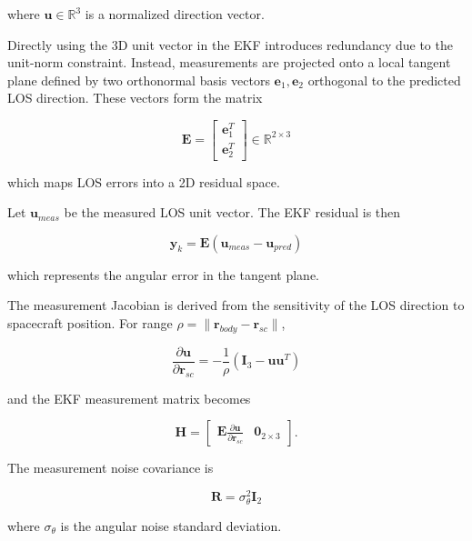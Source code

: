 \documentclass[twocolumn]{article}
\begin{document}
where $\mathbf{u}\in\mathbb{R}^3$ is a normalized direction vector.

Directly using the 3D unit vector in the EKF introduces redundancy due to the unit-norm constraint. Instead, measurements are projected onto a local tangent plane defined by two orthonormal basis vectors $\mathbf{e}_1,\mathbf{e}_2$ orthogonal to the predicted LOS direction. These vectors form the matrix

\begin{equation}
\mathbf{E} =
\begin{bmatrix}
\mathbf{e}_1^T \\
\mathbf{e}_2^T
\end{bmatrix}
\in \mathbb{R}^{2\times3}
\end{equation}

which maps LOS errors into a 2D residual space.

Let $\mathbf{u}_{meas}$ be the measured LOS unit vector. The EKF residual is then

\begin{equation}
\mathbf{y}_k =
\mathbf{E}\left(\mathbf{u}_{meas}-\mathbf{u}_{pred}\right)
\end{equation}

which represents the angular error in the tangent plane.

The measurement Jacobian is derived from the sensitivity of the LOS direction to spacecraft position. For range
$\rho = \|\mathbf{r}_{body}-\mathbf{r}_{sc}\|$,

\begin{equation}
\frac{\partial \mathbf{u}}{\partial \mathbf{r}_{sc}} =
-\frac{1}{\rho}
\left(
\mathbf{I}_3 - \mathbf{u}\mathbf{u}^T
\right)
\end{equation}

and the EKF measurement matrix becomes

\begin{equation}
\mathbf{H} =
\begin{bmatrix}
\mathbf{E}
\frac{\partial \mathbf{u}}{\partial \mathbf{r}_{sc}} & \mathbf{0}_{2\times3}
\end{bmatrix}.
\end{equation}

The measurement noise covariance is

\begin{equation}
\mathbf{R} = \sigma_{\theta}^{2}\mathbf{I}_2
\end{equation}

where $\sigma_\theta$ is the angular noise standard deviation.
\end{document}
